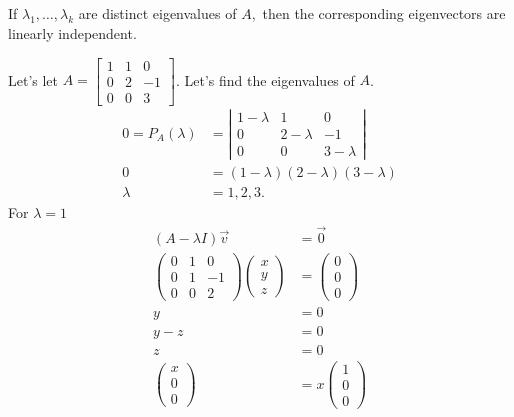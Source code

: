 \subsection{}
\begin{prop}
  If $\lambda_1,\ldots,\lambda_k$ are distinct eigenvalues of $A,$ then the corresponding eigenvectors are linearly independent.
\end{prop}
\begin{eg}
  Let's let $A=\begin{bmatrix} 1&1&0\\0&2&-1\\0&0&3 \end{bmatrix} $. Let's find the eigenvalues of $A$.
  \begin{align*}
    0=P_A(\lambda) &= \left| \begin{matrix} 1-\lambda&1&0\\0&2-\lambda&-1\\0&0&3-\lambda \end{matrix} \right| \\
    0&=(1-\lambda)(2-\lambda)(3-\lambda)\\
    \lambda&=1,2,3
  .\end{align*}
  For $\lambda=1$
  \begin{align*}
    (A-\lambda I)\vec{v}&=\vec{0}\\
    \begin{pmatrix} 0&1&0\\0&1&-1\\0&0&2 \end{pmatrix} \begin{pmatrix} x\\y\\z \end{pmatrix} &=\begin{pmatrix} 0\\0\\0 \end{pmatrix} \\
    y&=0\\
    y-z&=0\\
    z&=0\\
    \begin{pmatrix} x\\0\\0 \end{pmatrix} &=x\begin{pmatrix} 1\\0\\0 \end{pmatrix} 

\end{align*}
\end{eg}
